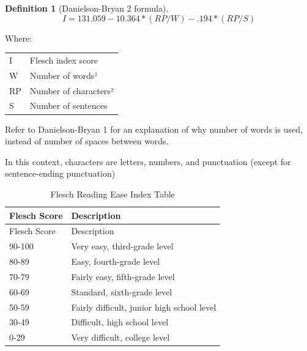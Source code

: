 \documentclass[
]{book}
\theoremstyle{definition}
\newtheorem{definition}{Definition}[chapter]
\theoremstyle{definition}
\theoremstyle{definition}
\theoremstyle{definition}
\theoremstyle{remark}
\begin{document}
\begin{definition}[Danielson-Bryan 2 formula]
\protect\hypertarget{def:db2}{}{\label{def:db2} {} }\[
I = 131.059 - 10.364*(RP/W) - .194*(RP/S)
\]
\end{definition}

Where:

\begin{table}
\centering
\begin{threeparttable}
\begin{tabular}[t]{l>{\raggedright\arraybackslash}p{10cm}}
\toprule
I & Flesch index score\\
W & Number of words¹\\
RP & Number of characters²\\
S & Number of sentences\\
\bottomrule
\end{tabular}
\begin{tablenotes}
\item[1] Refer to Danielson-Bryan 1 for an explanation of why number of words is used, instead of number of spaces between words.
\item[2] In this context, characters are letters, numbers, and punctuation (except for sentence-ending punctuation)
\end{tablenotes}
\end{threeparttable}
\end{table}

\begin{longtable}[]{@{}ll@{}}
\caption{Flesch Reading Ease Index Table}\tabularnewline
\toprule
Flesch Score & Description \\
\midrule
\endfirsthead
\toprule
Flesch Score & Description \\
\midrule
\endhead
90-100 & Very easy, third-grade level \\
80-89 & Easy, fourth-grade level \\
70-79 & Fairly easy, fifth-grade level \\
60-69 & Standard, sixth-grade level \\
50-59 & Fairly difficult, junior high school level \\
30-49 & Difficult, high school level \\
0-29 & Very difficult, college level \\
\bottomrule
\end{longtable}

\end{document}
